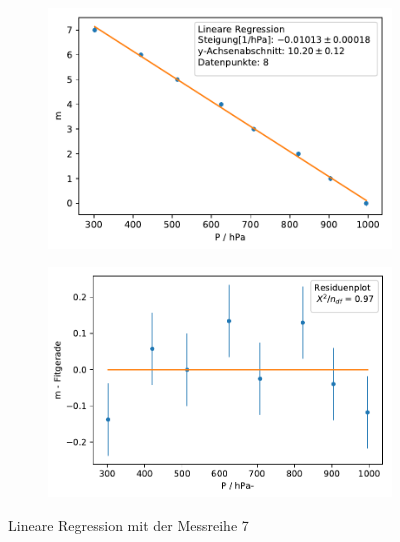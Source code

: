 \documentclass[12pt,a4paper]{article}
\begin{document}
\begin{figure}[H]
	\centering	
	\begin{subfigure}{0.49\textwidth}
		\centering
		\includegraphics[width=\textwidth]{Python/MR7_LinReg.pdf}
	\end{subfigure}
	\begin{subfigure}{0.49\textwidth}
		\centering
		\includegraphics[width=\textwidth]{Python/MR7_Residuen.pdf}
	\end{subfigure}
	\caption{Lineare Regression mit der Messreihe 7}
	\label{MR7_LinReg}
\end{figure}
\end{document}
